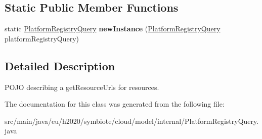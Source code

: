 \subsection*{Static Public Member Functions}
\begin{DoxyCompactItemize}
\item 
\mbox{\label{classeu_1_1h2020_1_1symbiote_1_1cloud_1_1model_1_1internal_1_1PlatformRegistryQuery_a7cc619acc859c3f4ee019bd40752ea60}} 
static \hyperlink{classeu_1_1h2020_1_1symbiote_1_1cloud_1_1model_1_1internal_1_1PlatformRegistryQuery}{Platform\+Registry\+Query} {\bfseries new\+Instance} (\hyperlink{classeu_1_1h2020_1_1symbiote_1_1cloud_1_1model_1_1internal_1_1PlatformRegistryQuery}{Platform\+Registry\+Query} platform\+Registry\+Query)
\end{DoxyCompactItemize}


\subsection{Detailed Description}
P\+O\+JO describing a get\+Resource\+Urls for resources. 

The documentation for this class was generated from the following file\+:\begin{DoxyCompactItemize}
\item 
src/main/java/eu/h2020/symbiote/cloud/model/internal/Platform\+Registry\+Query.\+java\end{DoxyCompactItemize}
